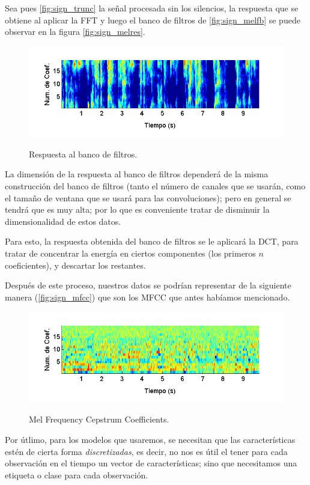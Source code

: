 Sea pues \autoref{fig:sign_trunc} la señal procesada sin los silencios, la respuesta que se obtiene al aplicar la \ac{FFT} y luego el banco de filtros de \autoref{fig:sign_melfb} se puede observar en la figura \autoref{fig:sign_melres}.
\begin{figure}[bth]
  \myfloatalign
  {\includegraphics[width=0.9\linewidth]{gfx/chap2/signal-mel}} \quad
  \caption{Respuesta al banco de filtros.}
  \label{fig:sign_melres}
\end{figure}

La dimensión de la respuesta al banco de filtros dependerá de la misma construcción del banco de filtros (tanto el número de canales que se usarán, como el tamaño de ventana que se usará para las convoluciones); pero en general se tendrá que es muy alta; por lo que es conveniente tratar de disminuir la dimensionalidad de estos datos.

Para esto, la respuesta obtenida del banco de filtros se le aplicará la \ac{DCT}, para tratar de concentrar la energía en ciertos componentes (los primeros $n$ coeficientes), y descartar los restantes.

Después de este proceso, nuestros datos se podrían representar de la siguiente manera (\autoref{fig:sign_mfcc}) que son los \ac{MFCC} que antes habíamos mencionado.
\begin{figure}[bth]
  \myfloatalign
  {\includegraphics[width=0.9\linewidth]{gfx/chap2/signal-mfcc}} \quad
  \caption{Mel Frequency Cepstrum Coefficients.}
  \label{fig:sign_mfcc}
\end{figure}

Por útlimo, para los modelos que usaremos, se necesitan que las características estén de cierta forma \textit{discretizadas}, es decir, no nos es útil el tener para cada observación en el tiempo un vector de características; sino que necesitamos una etiqueta o clase para cada observación. 

